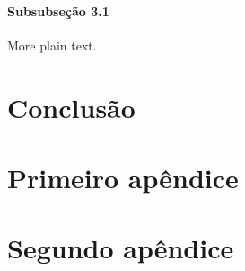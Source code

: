 \documentclass[twoside,openright,a4paper]{abntex2}
\begin{document}
\subsubsection{Subsubseção 3.1}

More plain text.

\lipsum[18-20]



\chapter*{Conclusão}

\lipsum[21-23]





%
%

\appendix

\chapter{Primeiro apêndice}

\lipsum[50-52]

\chapter{Segundo apêndice}
\lipsum[55-57]

\end{document}
